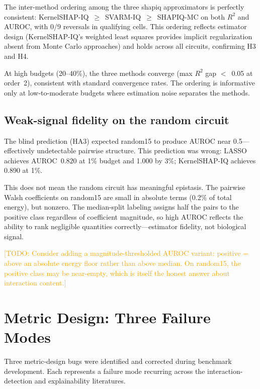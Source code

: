 \documentclass[11pt]{article}
\newcommand{\todo}[1]{\textcolor{orange}{[TODO: #1]}}
\begin{document}
The inter-method ordering among the three shapiq approximators is
perfectly consistent: KernelSHAP-IQ~$\geq$~SVARM-IQ~$\geq$~SHAPIQ-MC
on both $R^2$ and AUROC, with 0/9 reversals in qualifying cells.
This ordering reflects estimator design
(KernelSHAP-IQ's weighted least squares provides implicit
regularization absent from Monte Carlo approaches) and holds across
all circuits, confirming H3 and H4.

At high budgets (20--40\%), the three methods converge
(max $R^2$ gap $<$~0.05 at order~2), consistent with standard
convergence rates. The ordering is informative only at low-to-moderate
budgets where estimation noise separates the methods.


\subsection{Weak-signal fidelity on the random circuit}
\label{sec:weak-signal}

The blind prediction (HA3) expected random15 to produce AUROC near
0.5---effectively undetectable pairwise structure. This prediction
was wrong: LASSO achieves AUROC~$0.820$ at 1\% budget and 1.000 by
3\%; KernelSHAP-IQ achieves 0.890 at 1\%.

This does not mean the random circuit has meaningful epistasis.
The pairwise Walsh coefficients on random15 are small in absolute
terms (0.2\% of total energy), but nonzero. The median-split
labeling assigns half the pairs to the positive class regardless
of coefficient magnitude, so high AUROC reflects the ability to
rank negligible quantities correctly---estimator fidelity, not
biological signal.

\todo{Consider adding a magnitude-thresholded AUROC variant:
positive = above an absolute energy floor rather than above
median. On random15, the positive class may be near-empty,
which is itself the honest answer about interaction content.}


\section{Metric Design: Three Failure Modes}
\label{sec:audit}

Three metric-design bugs were identified and corrected during
benchmark development. Each represents a failure mode recurring
across the interaction-detection and explainability literatures.
\end{document}
